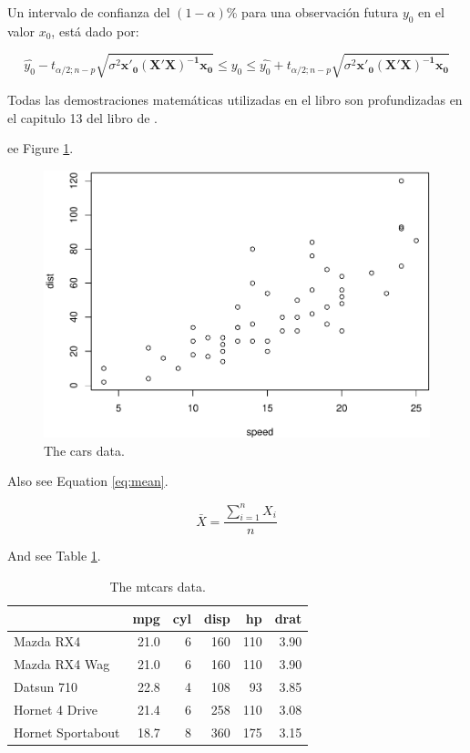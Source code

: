\documentclass[
]{book}
\begin{document}
Un intervalo de confianza del \((1-\alpha)\)\% para una observación futura \(y_{0}\) en el valor \(x_{0}\), está dado por:

\[
\begin{equation}
\hat{y_{0}}-t_{\alpha/2;n-p}\sqrt{\sigma^{2}\boldsymbol{x'_{0}(X'X)^{-1}x_{0}}}\leq y_{0}\leq\hat{y_{0}}+t_{\alpha/2;n-p}\sqrt{\sigma^{2}\boldsymbol{x'_{0}(X'X)^{-1}x_{0}}}
\end{equation}
\]

Todas las demostraciones matemáticas utilizadas en el libro son profundizadas en el capitulo 13 del libro de \citet{wackerly2002estadistica} .

ee Figure \ref{fig:cars-plot}.

\begin{figure}
\centering
\includegraphics{_main_files/figure-latex/cars-plot-1.pdf}
\caption{\label{fig:cars-plot}The cars data.}
\end{figure}

Also see Equation \eqref{eq:mean}.

\begin{equation}
\bar{X} = \frac{\sum_{i=1}^n X_i}{n} \label{eq:mean}
\end{equation}

And see Table \ref{tab:mtcars}.

\begin{table}

\caption{\label{tab:mtcars}The mtcars data.}
\centering
\begin{tabular}[t]{l|r|r|r|r|r}
\hline
  & mpg & cyl & disp & hp & drat\\
\hline
Mazda RX4 & 21.0 & 6 & 160 & 110 & 3.90\\
\hline
Mazda RX4 Wag & 21.0 & 6 & 160 & 110 & 3.90\\
\hline
Datsun 710 & 22.8 & 4 & 108 & 93 & 3.85\\
\hline
Hornet 4 Drive & 21.4 & 6 & 258 & 110 & 3.08\\
\hline
Hornet Sportabout & 18.7 & 8 & 360 & 175 & 3.15\\
\hline
\end{tabular}
\end{table}

  
\end{document}
